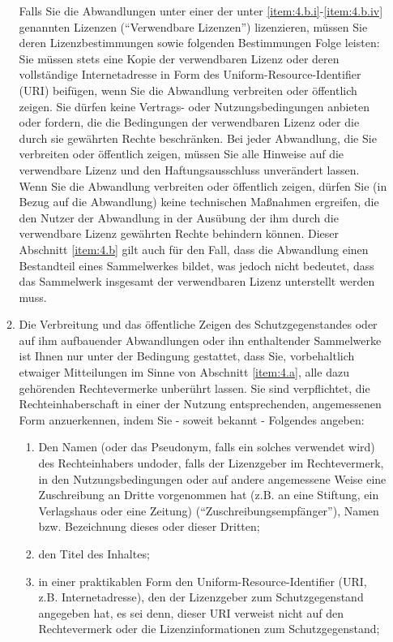 \begin{enumerate}
\begin{enumerate}
Falls Sie die Abwandlungen unter einer der unter \ref{item:4.b.i}-\ref{item:4.b.iv} genannten Lizenzen (``Verwendbare Lizenzen'') lizenzieren, müssen Sie deren Lizenzbestimmungen sowie folgenden Bestimmungen Folge leisten: Sie müssen stets eine Kopie der verwendbaren Lizenz oder deren vollständige Internetadresse in Form des Uniform-Resource-Identifier (URI) beifügen, wenn Sie die Abwandlung verbreiten oder öffentlich zeigen. Sie dürfen keine Vertrags- oder Nutzungsbedingungen anbieten oder fordern, die die Bedingungen der verwendbaren Lizenz oder die durch sie gewährten Rechte beschränken. Bei jeder Abwandlung, die Sie verbreiten oder öffentlich zeigen, müssen Sie alle Hinweise auf die verwendbare Lizenz und den Haftungsausschluss unverändert lassen. Wenn Sie die Abwandlung verbreiten oder öffentlich zeigen, dürfen Sie (in Bezug auf die Abwandlung) keine technischen Maßnahmen ergreifen, die den Nutzer der Abwandlung in der Ausübung der ihm durch die verwendbare Lizenz gewährten Rechte behindern können. Dieser Abschnitt \ref{item:4.b} gilt auch für den Fall, dass die Abwandlung einen Bestandteil eines Sammelwerkes bildet, was jedoch nicht bedeutet, dass das Sammelwerk insgesamt der verwendbaren Lizenz unterstellt werden muss. 
      \item \label{item:4.c} Die Verbreitung und das öffentliche Zeigen des Schutzgegenstandes oder auf ihm aufbauender Abwandlungen oder ihn enthaltender Sammelwerke ist Ihnen nur unter der Bedingung gestattet, dass Sie, vorbehaltlich etwaiger Mitteilungen im Sinne von Abschnitt \ref{item:4.a}, alle dazu gehörenden Rechtevermerke unberührt lassen. Sie sind verpflichtet, die Rechteinhaberschaft in einer der Nutzung entsprechenden, angemessenen Form anzuerkennen, indem Sie - soweit bekannt - Folgendes angeben:
        \begin{enumerate}
          \item Den Namen (oder das Pseudonym, falls ein solches verwendet wird) des Rechteinhabers und\/oder, falls der Lizenzgeber im Rechtevermerk, in den Nutzungsbedingungen oder auf andere angemessene Weise eine Zuschreibung an Dritte vorgenommen hat (z.B. an eine Stiftung, ein Verlagshaus oder eine Zeitung) (``Zuschreibungsempfänger''), Namen bzw. Bezeichnung dieses oder dieser Dritten;
          \item den Titel des Inhaltes;
          \item in einer praktikablen Form den Uniform-Resource-Identifier (URI, z.B. Internetadresse), den der Lizenzgeber zum Schutzgegenstand angegeben hat, es sei denn, dieser URI verweist nicht auf den Rechtevermerk oder die Lizenzinformationen zum Schutzgegenstand;

\end{enumerate}
\end{enumerate}
\end{enumerate}

